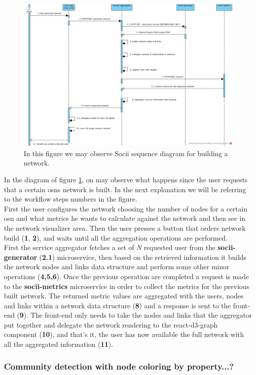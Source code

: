 \begin{figure}[h!]
\begin{center}
  \hspace*{-0.8in}
  \includegraphics[width=1.2\textwidth]{img/socii-sd.jpg}
\end{center}
\caption{\label{img:sociisd} In this figure we may observe Socii sequence diagram for building a network.}
\end{figure}

In the diagram of figure \ref{img:sociisd}, on may observe what happens since the user requests that a certain \glspl{osn} network is built. In the next explanation we will be referring to the workflow steps numbers in the figure.\\
\indent First the user configures the network choosing the number of nodes for a certain \gls{osn} and what metrics he wants to calculate against the network and then see in the network visualizer area. Then the user presses a button that orders network build (\textbf{1}, \textbf{2}), and waits until all the aggregation operations are performed.\\
\indent First the service aggregator fetches a set of \textit{N} requested user from the \textbf{socii-generator} (\textbf{2.1}) microservice, then based on the retrieved information it builds the network nodes and links data structure and perform some other minor operations (\textbf{4,5,6}). Once the previous operation are completed a request is made to the \textbf{socii-metrics} microservice in order to collect the metrics for the previous built network. The returned metric values are aggregated with the users, nodes and links within a network data structure (\textbf{8}) and a response is sent to the front-end (\textbf{9}). The front-end only needs to take the nodes and links that the aggregator put together and delegate the network rendering to the react-d3-graph component (\textbf{10}), and that's it, the user has now available the full network with all the aggregated information (\textbf{11}).

\subsubsection{Community detection with node coloring by property...?}


